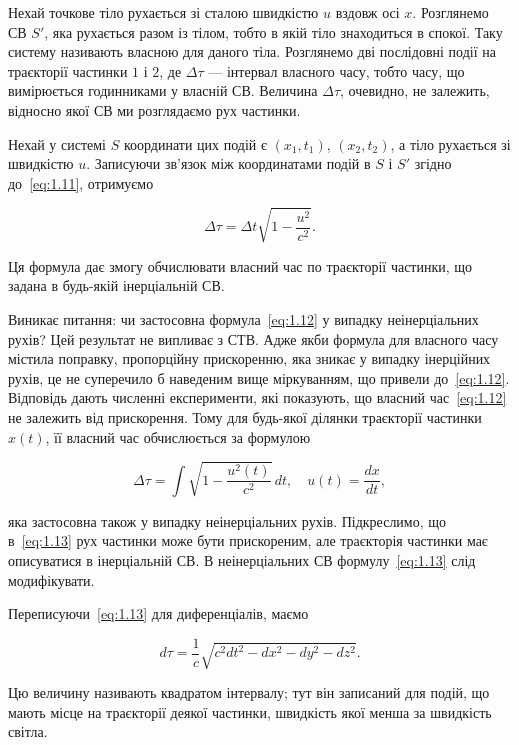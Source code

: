 Нехай точкове тіло рухається зі сталою швидкістю $u$ вздовж осі $x$. Розглянемо СВ $S'$, яка рухається разом із тілом, тобто в якій тіло знаходиться в спокої. Таку систему називають власною для даного тіла. Розглянемо дві послідовні події на траєкторії частинки $1$ і $2$, де $\Delta \tau$ --- інтервал власного часу, тобто часу, що вимірюється годинниками у власній СВ. Величина $\Delta \tau$, очевидно, не залежить, відносно якої СВ ми розглядаємо рух частинки.

Нехай у системі $S$ координати цих подій є $(x_1, t_1)$, $(x_2, t_2)$, а тіло рухається зі швидкістю $u$. Записуючи зв’язок між координатами подій в $S$ і $S'$ згідно до~\eqref{eq:1.11}, отримуємо

\begin{equation}
\Delta \tau = \Delta t \sqrt{1 - \frac{u^2}{c^2}}.
\label{eq:1.12}
\end{equation}

Ця формула дає змогу обчислювати власний час по траєкторії частинки, що задана в будь-якій інерціальній СВ.

Виникає питання: чи застосовна формула~\eqref{eq:1.12} у випадку неінерціальних рухів? Цей результат не випливає з СТВ. Адже якби формула для власного часу містила поправку, пропорційну прискоренню, яка зникає у випадку інерційних рухів, це не суперечило б наведеним вище міркуванням, що привели до~\eqref{eq:1.12}. Відповідь дають численні експерименти, які показують, що власний час~\eqref{eq:1.12} не залежить від прискорення. Тому для будь-якої ділянки траєкторії частинки $x(t)$, її власний час обчислюється за формулою

\begin{equation}
\Delta \tau = \int \sqrt{1 - \frac{u^2(t)}{c^2}} \, dt, \quad u(t) = \frac{dx}{dt},
\label{eq:1.13}
\end{equation}

яка застосовна також у випадку неінерціальних рухів. Підкреслимо, що в~\eqref{eq:1.13} рух частинки може бути прискореним, але траєкторія частинки має описуватися в інерціальній СВ. В неінерціальних СВ формулу~\eqref{eq:1.13} слід модифікувати.

Переписуючи~\eqref{eq:1.13} для диференціалів, маємо

\[
d\tau = \frac{1}{c} \sqrt{c^2 dt^2 - dx^2 - dy^2 - dz^2}.
\]

Цю величину називають квадратом інтервалу; тут він записаний для подій, що мають місце на траєкторії деякої частинки, швидкість якої менша за швидкість світла.


